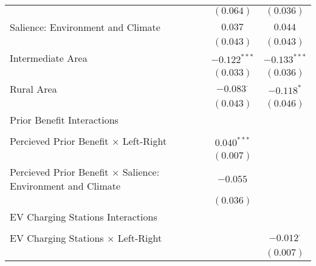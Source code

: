 \begin{center}
\begin{tiny}
\begin{longtable}{l@{} c@{} c@{}}
                                                                         & $(0.064)$        & $(0.036)$        \\
\quad Salience: Environment and Climate                                  & $0.037$          & $0.044$          \\
                                                                         & $(0.043)$        & $(0.043)$        \\
\quad Intermediate Area                                                  & $-0.122^{***}$   & $-0.133^{***}$   \\
                                                                         & $(0.033)$        & $(0.036)$        \\
\quad Rural Area                                                         & $-0.083^{\cdot}$ & $-0.118^{*}$     \\
                                                                         & $(0.043)$        & $(0.046)$        \\
Prior Benefit Interactions                                               &                  &                  \\
                                                                         &                  &                  \\
\quad Percieved Prior Benefit $\times$ Left-Right                        & $0.040^{***}$    &                  \\
                                                                         & $(0.007)$        &                  \\
\quad Percieved Prior Benefit $\times$ Salience: Environment and Climate & $-0.055$         &                  \\
                                                                         & $(0.036)$        &                  \\
EV Charging Stations Interactions                                        &                  &                  \\
                                                                         &                  &                  \\
\quad EV Charging Stations $\times$ Left-Right                           &                  & $-0.012^{\cdot}$ \\
                                                                         &                  & $(0.007)$        \\

\end{longtable}
\end{tiny}
\end{center}
